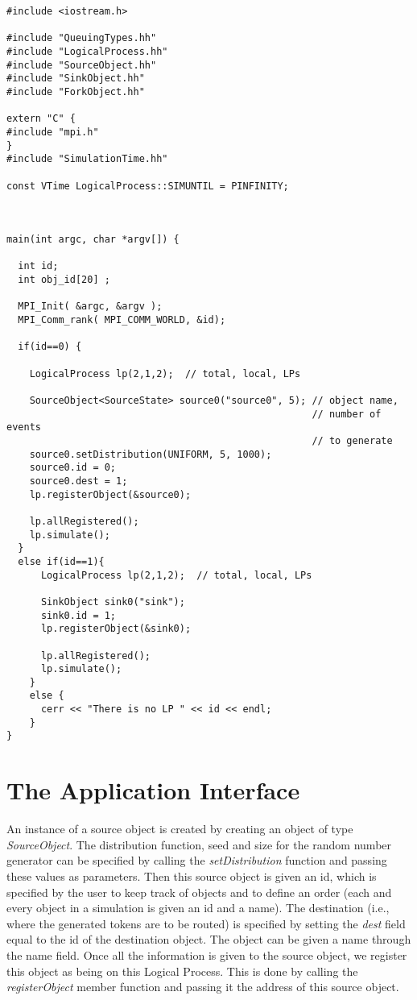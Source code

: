 \documentclass[11pt]{report}
\begin{document}
\begin{verbatim}
#include <iostream.h>

#include "QueuingTypes.hh"
#include "LogicalProcess.hh"
#include "SourceObject.hh"
#include "SinkObject.hh"
#include "ForkObject.hh"

extern "C" {
#include "mpi.h"
}
#include "SimulationTime.hh" 

const VTime LogicalProcess::SIMUNTIL = PINFINITY;



main(int argc, char *argv[]) {
  
  int id;
  int obj_id[20] ;

  MPI_Init( &argc, &argv );
  MPI_Comm_rank( MPI_COMM_WORLD, &id);

  if(id==0) {

    LogicalProcess lp(2,1,2);  // total, local, LPs

    SourceObject<SourceState> source0("source0", 5); // object name,
                                                     // number of events 
                                                     // to generate
    source0.setDistribution(UNIFORM, 5, 1000);
    source0.id = 0;
    source0.dest = 1;
    lp.registerObject(&source0);
 
    lp.allRegistered();
    lp.simulate();
  }
  else if(id==1){
      LogicalProcess lp(2,1,2);  // total, local, LPs

      SinkObject sink0("sink");
      sink0.id = 1;
      lp.registerObject(&sink0);

      lp.allRegistered();
      lp.simulate();
    }
    else {
      cerr << "There is no LP " << id << endl;
    }
}
\end{verbatim}

\chapter{The Application Interface}

An instance of a source object is created by creating an object of type
{\it SourceObject}.  The distribution function, seed and size for the
random number generator can be specified by calling the
{\it setDistribution} function and passing these values as parameters.
Then this source object is given an id, which is specified by the user
to keep track of objects and to define an order (each and every object
in a simulation is given an id and a name).  The destination (i.e.,
where the generated tokens are to be routed) is specified by setting the
{\it dest} field equal to the id of the destination object.  The object
can be given a name through the name field.  Once all the information is
given to the source object, we register this object as being on this
Logical Process.  This is done by calling the {\it registerObject}
member function and passing it the address of this source object.
\end{document}
